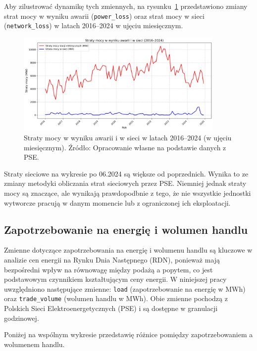 Aby zilustrować dynamikę tych zmiennych, na rysunku~\ref{fig:power_losses} przedstawiono zmiany strat mocy w wyniku awarii (\texttt{power\_loss}) oraz strat mocy w sieci (\texttt{network\_loss}) w latach 2016--2024 w ujęciu miesięcznym.

\begin{figure}[h]
    \centering
    \includegraphics[width=0.9\textwidth]{../plots/losses/power_losses_2016_2024.png}
    \caption{Straty mocy w wyniku awarii i w sieci w latach 2016--2024 (w ujęciu miesięcznym). Źródło: Opracowanie własne na podstawie danych z PSE.}
    \label{fig:power_losses}
\end{figure}

Straty sieciowe na wykresie po 06.2024 są większe od poprzednich. Wynika to ze zmiany metodyki obliczania strat sieciowych przez PSE. Niemniej jednak straty mocy są znaczące, ale wynikają prawdopodbnie z tego, że nie wszystkie jednostki wytworcze pracują w danym momencie lub z ograniczonej ich eksploatacji. 

\subsection{Zapotrzebowanie na energię i wolumen handlu}
\label{subsec:demand}

Zmienne dotyczące zapotrzebowania na energię i wolumenu handlu są kluczowe w analizie cen energii na Rynku Dnia Następnego (RDN), ponieważ mają bezpośredni wpływ na równowagę między podażą a popytem, co jest podstawowym czynnikiem kształtującym ceny energii. W niniejszej pracy uwzględniono następujące zmienne: \texttt{load} (zapotrzebowanie na energię w MWh) oraz \texttt{trade\_volume} (wolumen handlu w MWh). Obie zmienne pochodzą z Polskich Sieci Elektroenergetycznych (PSE) i są dostępne w granulacji godzinowej.

Poniżej na wspólnym wykresie przedstawię różnice pomiędzy zapotrzebowaniem a wolumenem handlu.

